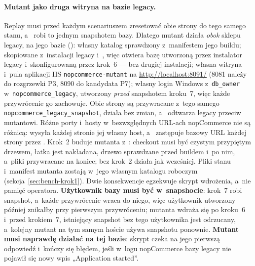 \paragraph{Mutant jako druga witryna na bazie legacy.} Replay musi przed każdym
scenariuszem zresetować obie strony do tego samego stanu, a~
robi to jednym snapshotem bazy. Dlatego mutant działa \emph{obok} sklepu legacy, na jego
bazie (): własny katalog
 sprawdzony z~manifestem jego buildu; skopiowane
z~instalacji legacy  i~,
więc otwiera bazę utworzoną przez instalator legacy i~skonfigurowaną przez krok~6 --- bez
drugiej instalacji; własna witryna i~pula aplikacji IIS \texttt{nopcommerce-mutant} na
\url{http://localhost:8091/} (8081 należy do rozgrzewki P3, 8090 do kandydata P7);
własny login Windows z~\texttt{db\_owner} w~\texttt{nopcommerce\_legacy}, utworzony
\emph{przed} snapshotem kroku~7, więc każde przywrócenie go zachowuje. Obie strony są
przywracane z~tego samego \texttt{nopcommerce\_legacy\_snapshot}, 
działa bez zmian, a~ odtwarza
legacy przeciw mutantowi. Różne porty i~hosty w~bezwzględnych URL-ach nopCommerce nie są
różnicą:  wysyła każdej stronie jej własny host, a~
zastępuje bazowy URL każdej strony przez . Krok~2 buduje mutanta
z~: checkout musi być czystym przypiętym drzewem, łatka jest nakładana,
drzewo sprawdzane przed buildem i~po nim, a~pliki przywracane na koniec; bez
 krok~2 działa jak wcześniej. Pliki stanu i~manifest mutanta zostają w~jego
własnym katalogu roboczym (sekcja~\ref{sec:bench-krok1}). Dwie konsekwencje egzekwuje skrypt
wdrożenia, a~nie pamięć operatora. \textbf{Użytkownik bazy musi być w~snapshocie}: krok~7
robi snapshot, a~każde przywrócenie wraca do niego, więc użytkownik utworzony później
znikałby przy pierwszym przywróceniu; mutanta wdraża się po kroku~6 i~przed krokiem~7,
istniejący snapshot bez tego użytkownika jest odrzucany, a~kolejny mutant na tym samym
hoście używa snapshotu ponownie. \textbf{Mutant musi naprawdę działać na tej bazie}: skrypt
czeka na jego pierwszą odpowiedź i~kończy się błędem, jeśli w~logu nopCommerce bazy legacy
nie pojawił się nowy wpis „Application started”.

